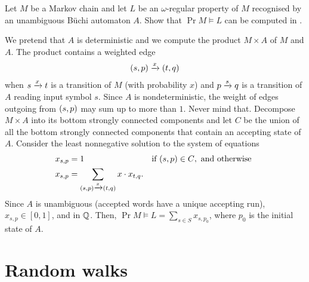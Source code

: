 \begin{exercise}
    Let $M$ be a Markov chain
    and let $L$ be an $\omega$-regular property of $M$ recognised by an unambiguous Büchi automaton $A$.
    Show that $\Pr {M \models L}$ can be computed in \PTIME.
\end{exercise}
\begin{solution}
    We pretend that $A$ is deterministic and we compute the product $M \times A$ of $M$ and $A$.
    The product contains a weighted edge
    \begin{align*}
        \left( s, p \right) \xrightarrow{x} \left( t, q \right)
    \end{align*}
    when $s \xrightarrow{x} t$ is a transition of $M$ (with probability $x$)
    and $p \xrightarrow{s} q$ is a transition of $A$ reading input symbol $s$.
    Since $A$ is nondeterministic, the weight of edges outgoing from $\left( s, p \right)$ may sum up to more than $1$.
    Never mind that.
    Decompose $M \times A$ into its bottom strongly connected components
    and let $C$ be the union of all the bottom strongly connected components that contain an accepting state of $A$.
    Consider the least nonnegative solution to the system of equations
    \begin{align*}
        x_{s, p} &= 1 && \text{if $\left( s, p \right) \in C$}, \text{ and otherwise } \\
        x_{s, p} &= \sum_{\left( s, p \right) \xrightarrow{x} \left( t, q \right)} x \cdot x_{t, q}.
    \end{align*}
    Since $A$ is unambiguous (accepted words have a unique accepting run), $x_{s, p} \in [0, 1]$, and in $\mathbb Q$.
    Then, $\Pr {M \models L} = \sum_{s \in S} x_{s, p_0}$, where $p_0$ is the initial state of $A$.
\end{solution}

\section*{Random walks}

